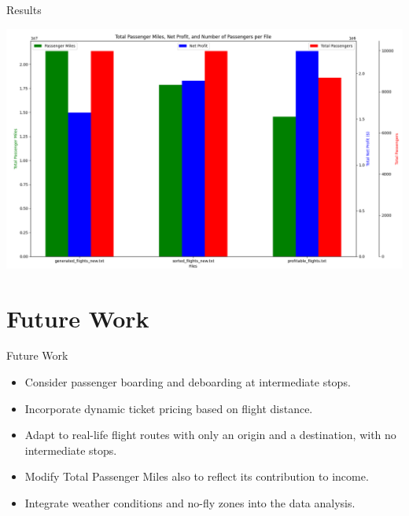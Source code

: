 \documentclass[aspectratio=169,xcolor=dvipsnames]{beamer}
\begin{document}
\begin{frame}{Results} 
    \begin{center}
        \includegraphics[width=\textwidth, height=0.9\textheight, keepaspectratio]{images/Figure_1.png}
    \end{center} 
\end{frame}

\section{Future Work}

\begin{frame}{Future Work}
    \vfill
    \begin{itemize}
        \item Consider passenger boarding and deboarding at intermediate stops.
        \vfill
        \item Incorporate dynamic ticket pricing based on flight distance.
        \vfill
        \item Adapt to real-life flight routes with only an origin and a destination, with no intermediate stops.
        \vfill
        \item Modify Total Passenger Miles also to reflect its contribution to income.
        \vfill
        \item Integrate weather conditions and no-fly zones into the data analysis.
    \end{itemize}
    \vfill
\end{frame}
\end{document}
